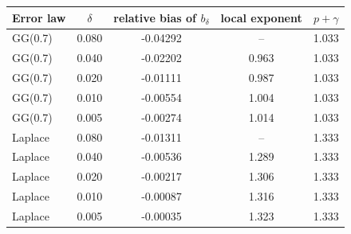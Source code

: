 \begin{tabular}{lcccc}
\toprule
Error law & $\delta$ & relative bias of $b_\delta$ & local exponent & $p+\gamma$ \\
\midrule
GG(0.7) & 0.080 & -0.04292 & -- & 1.033 \\
GG(0.7) & 0.040 & -0.02202 & 0.963 & 1.033 \\
GG(0.7) & 0.020 & -0.01111 & 0.987 & 1.033 \\
GG(0.7) & 0.010 & -0.00554 & 1.004 & 1.033 \\
GG(0.7) & 0.005 & -0.00274 & 1.014 & 1.033 \\
Laplace & 0.080 & -0.01311 & -- & 1.333 \\
Laplace & 0.040 & -0.00536 & 1.289 & 1.333 \\
Laplace & 0.020 & -0.00217 & 1.306 & 1.333 \\
Laplace & 0.010 & -0.00087 & 1.316 & 1.333 \\
Laplace & 0.005 & -0.00035 & 1.323 & 1.333 \\
\bottomrule
\end{tabular}
